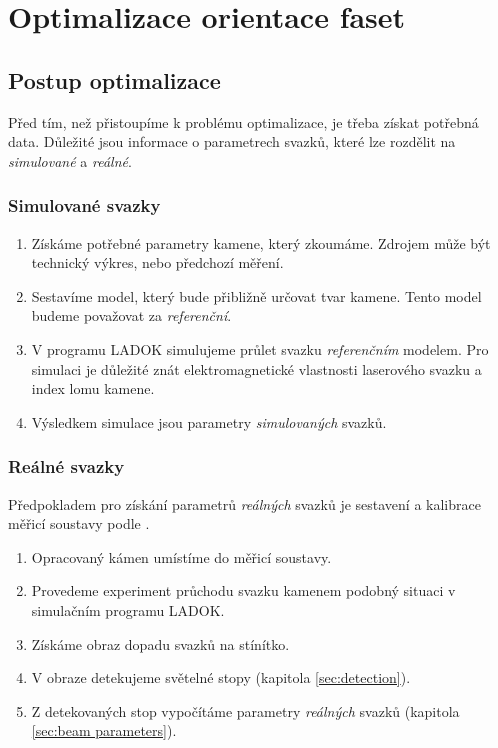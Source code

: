 \chapter{Optimalizace orientace faset}
	
\section{Postup optimalizace}
	Před tím, než přistoupíme k problému optimalizace, je třeba získat potřebná data. Důležité jsou informace o parametrech svazků, které lze rozdělit na \textit{simulované} a \textit{reálné}.

\subsection*{Simulované svazky}
\begin{enumerate}

\item 	Získáme potřebné parametry kamene, který zkoumáme. Zdrojem může být technický výkres, nebo předchozí měření.  

\item	Sestavíme model, který bude přibližně určovat tvar kamene. Tento model budeme považovat za \textit{referenční}.

\item	V programu LADOK simulujeme průlet svazku \textit{referenčním} modelem. Pro simulaci je důležité znát elektromagnetické vlastnosti laserového svazku a index lomu kamene. 

\item	Výsledkem simulace jsou parametry \textit{simulovaných} svazků.

\end{enumerate}

\subsection*{Reálné svazky}
Předpokladem pro získání parametrů \textit{reálných} svazků je sestavení a kalibrace měřicí soustavy podle \cite{Drapela}. %
\begin{enumerate}

\item 	Opracovaný kámen umístíme do měřicí soustavy.

\item	Provedeme experiment průchodu svazku kamenem podobný situaci v simulačním programu LADOK. 

\item	Získáme obraz dopadu svazků na stínítko. 

\item	V obraze detekujeme světelné stopy (kapitola \ref{sec:detection}).  

\item	Z detekovaných stop vypočítáme parametry \textit{reálných} svazků (kapitola \ref{sec:beam parameters}).

\end{enumerate}

